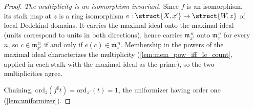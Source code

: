 \begin{proof}
  \emph{The multiplicity is an isomorphism invariant.} Since \(f\) is an isomorphism,
  its stalk map at \(z\) is a ring isomorphism \(e : \struct{X,x'} \to \struct{W,z}\)
  of local Dedekind domains. It carries the maximal ideal onto the maximal ideal
  (units correspond to units in both directions), hence carries
  \(\mathfrak m_{x'}^{\,n}\) onto \(\mathfrak m_z^{\,n}\) for every \(n\), so
  \(c \in \mathfrak m_{x'}^{\,n}\) if and only if \(e(c) \in \mathfrak m_z^{\,n}\).
  Membership in the powers of the maximal ideal characterizes the multiplicity
  (\ref{lem:mem_pow_iff_le_count}, applied in each stalk with the maximal ideal as the
  prime), so the two multiplicities agree.

  Chaining, \(\mathrm{ord}_z(f^{\sharp}t) = \mathrm{ord}_{x'}(t) = 1\), the
  uniformizer having order one (\ref{lem:uniformizer}).
\end{proof}

